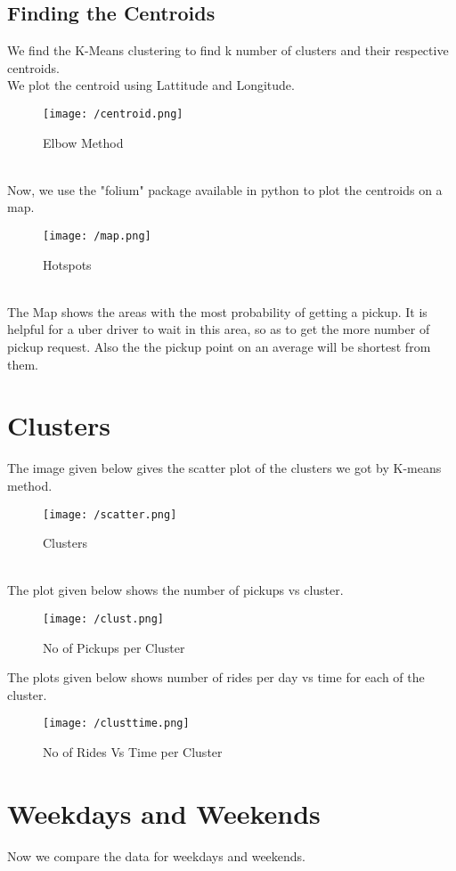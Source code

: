 \documentclass[fleqn]{report}
\begin{document}
	\subsection{Finding the Centroids}
	We find the K-Means clustering to find k number of clusters and their respective centroids.\\
	We plot the centroid using Lattitude and Longitude.
	\begin{figure}[!ht]
		\centering
		\texttt{[image: /centroid.png]}
		\caption{Elbow Method}
		\label{fig:centroid}
	\end{figure}\\
	Now, we use the "folium" package available in python to plot the centroids on a map.
	\begin{figure}[!ht]
		\centering
		\texttt{[image: /map.png]}
		\caption{Hotspots}
		\label{fig:map}
	\end{figure}\\ 
	The Map shows the areas with the most probability of getting a pickup. It is helpful for a uber driver to wait in this area, so as to get the more number of pickup request. Also the the pickup point on an average will be shortest from them.
	
	\section{Clusters}
	The image given below gives the scatter plot of the clusters we got by K-means method.
	 \begin{figure}[!ht]
	 	\centering
	 	\texttt{[image: /scatter.png]}
	 	\caption{Clusters}
	 	\label{fig:scatter}
	 \end{figure}\\ 
 	The plot given below shows the number of pickups vs cluster.
 	\begin{figure}[!ht]
 		\centering
 		\texttt{[image: /clust.png]}
 		\caption{No of Pickups per Cluster}
 		\label{fig:clust}
 	\end{figure} 
 	The plots given below shows number of rides per day vs time for each of the cluster.
 	 \begin{figure}[!ht]
 		\centering
 		\texttt{[image: /clusttime.png]}
 		\caption{No of Rides Vs Time per Cluster}
 		\label{fig:c}
 	\end{figure} 
  	\section{Weekdays and Weekends}
  	Now we compare the data for weekdays and weekends.\\
\end{document}

